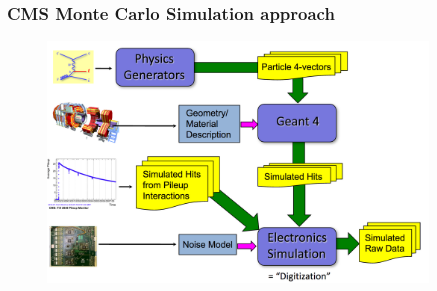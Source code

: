 \begin{frame}
\frametitle{CMS Monte Carlo Simulation approach}

\begin{figure}[htbp]
\begin{center}
\includegraphics[width=0.9\textwidth]{images/cms-mc-simulation-schematic.png}
\end{center}
\end{figure}

\end{frame}


